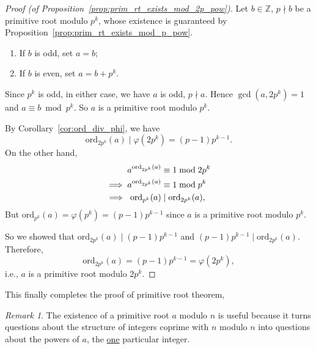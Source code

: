 \documentclass{amsbook}
\theoremstyle{plain}
\theoremstyle{definition}
\theoremstyle{remark}
\newtheorem{remark}[theorem]{Remark}
\numberwithin{equation}{chapter}
\numberwithin{figure}{chapter}
\newcommand{\Z}{\mathbb{Z}}
\newcommand*{\ord}{\text{ord}}
\begin{document}
\begin{proof}[Proof {\rm (of Proposition~\ref{prop:prim_rt_exists_mod_2p_pow})}]
  Let $b \in \Z$, $p \nmid b$ be a primitive root modulo $p^k$, whose existence is guaranteed by Proposition~\ref{prop:prim_rt_exists_mod_p_pow}.
  \begin{enumerate}[label=(\roman*)]
  \item If $b$ is odd, set $a = b$;
  \item If $b$ is even, set $a = b + p^k$.
  \end{enumerate}
  Since $p^k$ is odd, in either case, we have $a$ is odd, $p \nmid a$. Hence $\gcd (a, 2p^k) = 1$ and $a \equiv b \bmod p^k$. So $a$ is a primitive root modulo $p^k$.

  By Corollary~\ref{cor:ord_div_phi}, we have
  \[
    \ord_{2p^k} (a) \mid \varphi (2p^k) = (p-1)p^{k-1}.
  \]
  On the other hand,
  \begin{align}
    a^{\ord_{2p^k} (a)} & \equiv 1 \bmod 2p^k \\
    \implies a^{\ord_{2p^k} (a)} & \equiv 1 \bmod p^k \\
    \implies \hspace{1.1mm} \ord_{p^k} (a) &\mid \ord_{2p^k} (a),
  \end{align}
  But $\ord_{p^k} (a) = \varphi (p^k) = (p - 1)p^{k-1}$ since $a$ is a primitive root modulo $p^k$.

  So we showed that $\ord_{2p^k} (a) \mid (p - 1)p^{k-1}$ and $(p - 1)p^{k-1} \mid \ord_{2p^k} (a) $. Therefore,
  \[
    \ord_{2p^k} (a) = (p - 1)p^{k-1} = \varphi(2p^k),
  \]
  i.e., $a$ is a primitive root modulo $2p^k$.
\end{proof}
This finally completes the proof of primitive root theorem,
\primitiverootthm*
\begin{remark}
  The existence of a primitive root $a$ modulo $n$ is useful because it turns questions about the structure of integers coprime with $n$ modulo $n$ into questions about the powers of $a$, the \underline{one} particular integer.
\end{remark}
\end{document}
